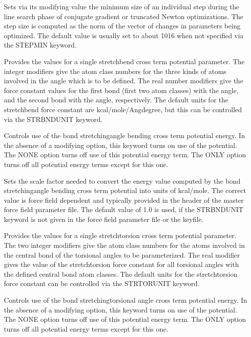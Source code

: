 \documentclass[letterpaper,11pt,english]{sphinxmanual}
\begin{document}
  Sets via its modifying value the minimum size of an individual step during the line search phase of conjugate gradient or truncated Newton optimizations. The step size is computed as the norm of the vector of changes in parameters being optimized. The default value is usually set to about 10\sphinxhyphen{}16 when not specified via the STEPMIN keyword.

  Provides the values for a single stretch\sphinxhyphen{}bend cross term potential parameter. The integer modifiers give the atom class numbers for the three kinds of atoms involved in the angle which is to be defined. The real number modifiers give the force constant values for the first bond (first two atom classes) with the angle, and the second bond with the angle, respectively. The default units for the stretch\sphinxhyphen{}bend force constant are kcal/mole/Ang\sphinxhyphen{}degree, but this can be controlled via the STRBNDUNIT keyword.

  Controls use of the bond stretching\sphinxhyphen{}angle bending cross term potential energy. In the absence of a modifying option, this keyword turns on use of the potential. The NONE option turns off use of this potential energy term. The ONLY option turns off all potential energy terms except for this one.

  Sets the scale factor needed to convert the energy value computed by the bond stretching\sphinxhyphen{}angle bending cross term potential into units of kcal/mole. The correct value is force field dependent and typically provided in the header of the master force field parameter file. The default value of 1.0 is used, if the STRBNDUNIT keyword is not given in the force field parameter file or the keyfile.

  Provides the values for a single stretch\sphinxhyphen{}torsion cross term potential parameter. The two integer modifiers give the atom class numbers for the atoms involved in the central bond of the torsional angles to be parameterized. The real modifier gives the value of the stretch\sphinxhyphen{}torsion force constant for all torsional angles with the defined central bond atom classes. The default units for the stretch\sphinxhyphen{}torsion force constant can be controlled via the STRTORUNIT keyword.

  Controls use of the bond stretching\sphinxhyphen{}torsional angle cross term potential energy. In the absence of a modifying option, this keyword turns on use of the potential. The NONE option turns off use of this potential energy term. The ONLY option turns off all potential energy terms except for this one.
\end{document}
